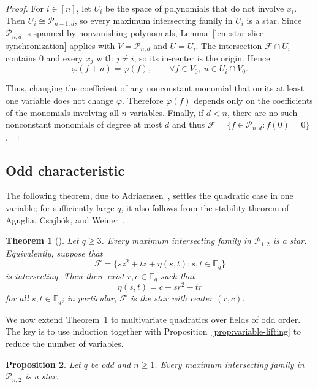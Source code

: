\documentclass[12pt,reqno]{amsart}
\newtheorem{thm}{Theorem}[section]
\newtheorem{prop}[thm]{Proposition}
\theoremstyle{definition}
\newcommand{\F}{\mathbb{F}}
\newcommand{\cF}{\mathcal F}
\newcommand{\cP}{\mathcal P}
\begin{document}
\begin{proof}
For $i\in[n]$, let $U_i$ be the space of polynomials that do not
involve $x_i$. Then $U_i\cong\cP_{n-1,d}$, so every maximum
intersecting family in $U_i$ is a star. Since $\cP_{n,d}$ is spanned
by nonvanishing polynomials,
Lemma~\ref{lem:star-slice-synchronization} applies with $V=\cP_{n,d}$ and $U=U_i$. The intersection $\cF\cap U_i$ contains $0$ and every $x_j$ with
$j\neq i$, so its in-center is the origin. Hence
\[
  \varphi(f+u)=\varphi(f), \qquad \forall f\in V_0,\ u\in U_i\cap V_0.
\]

Thus, changing the coefficient of any nonconstant monomial that omits
at least one variable does not change $\varphi$. Therefore
$\varphi(f)$ depends only on the coefficients of the monomials
involving all $n$ variables. Finally, if $d<n$, there are no such nonconstant monomials of degree at most $d$ and thus $\cF=\{f\in\cP_{n,d}:f(0)=0\}$.
\end{proof}

\subsection{Odd characteristic}\label{subsec:odd}
The following theorem, due to Adriaensen~\cite{A22}, settles the quadratic case in one variable; for sufficiently large $q$, it
also follows from the stability theorem of Aguglia, Csajb\'{o}k, and Weiner~\cite{ACW24}. 

\begin{thm}[\cite{A22}]\label{thm:univariate}
Let $q\geq3$. Every maximum intersecting family in $\cP_{1,2}$ is a star. Equivalently, suppose that
\[
\cF=\{sz^2+tz+\eta(s,t):s,t\in \F_q\}
\]
is intersecting. Then there exist $r,c\in \F_q$ such that
\[
\eta(s,t)=c-sr^2-tr
\]
for all $s,t\in \F_q$; in particular, $\cF$ is the star with center $(r,c)$.
\end{thm}

We now extend Theorem~\ref{thm:univariate} to multivariate quadratics over fields of odd order. The key is to use induction together with Proposition~\ref{prop:variable-lifting} to reduce the number of variables.

\begin{prop}\label{prop:quadratic}
Let $q$ be odd and $n\geq1$. Every maximum intersecting family in
$\cP_{n,2}$ is a star.
\end{prop}
\end{document}

